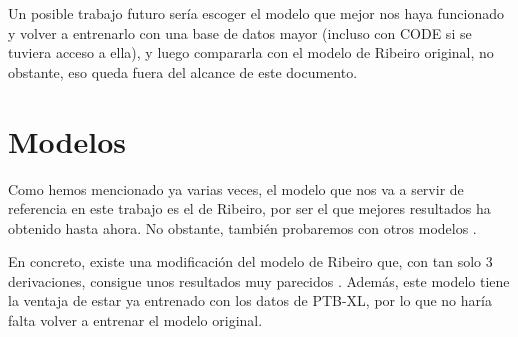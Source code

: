 Un posible trabajo futuro sería escoger el modelo que mejor nos haya funcionado y volver a entrenarlo con una base de datos mayor (incluso con CODE si se tuviera acceso a ella), y luego compararla con el modelo de Ribeiro original, no obstante, eso queda fuera del alcance de este documento.

\section{Modelos}
Como hemos mencionado ya varias veces, el modelo que nos va a servir de referencia en este trabajo es el de Ribeiro, por ser el que mejores resultados ha obtenido hasta ahora. No obstante, también probaremos con otros modelos .

En concreto, existe una modificación del modelo de Ribeiro que, con tan solo 3 derivaciones, consigue unos resultados muy parecidos \citep{TFGSergio}. Además, este modelo tiene la ventaja de estar ya entrenado con los datos de PTB-XL, por lo que no haría falta volver a entrenar el modelo original.